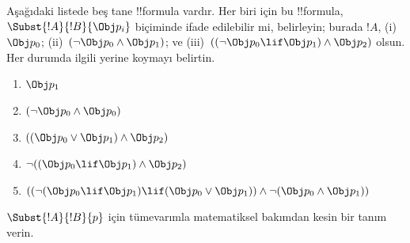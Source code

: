 \documentclass[../../../include/open-logic-section]{subfiles}
\begin{document}
\begin{prob} Aşağıdaki listede beş tane !!{formula} vardır. Her biri için bu
 !!{formula}, \( \Subst{!A}{!B}{\Obj p_i} \) biçiminde ifade edilebilir mi,
 belirleyin; burada \( !A \), (i)~\( \Obj p_0 \); (ii)~\( ( \lnot \Obj p_0
 \land \Obj p_1) \); ve (iii)~\( ( ( \lnot \Obj p_0 \lif \Obj p_1 ) \land
 \Obj p_2 ) \) olsun. Her durumda ilgili yerine koymayı belirtin.
  \begin{enumerate}
    \item \( \Obj p_1 \) 
    \item \( ( \lnot \Obj p_0 \land \Obj p_0 ) \)
    \item \( ( ( \Obj p_0 \lor \Obj p_1 ) \land \Obj p_2 )  \)
    \item \( \lnot ( ( \Obj p_0 \lif \Obj p_1 ) \land \Obj p_2 ) \)
    \item \( (( \lnot ( \Obj p_0 \lif \Obj p_1 ) \lif ( \Obj p_0 \lor \Obj p_1 )) \land \lnot ( \Obj p_0 \land \Obj p_1 )) \)
  \end{enumerate}
\end{prob}

\begin{prob}
$\Subst{!A}{!B}{p}$ için tümevarımla matematiksel bakımdan kesin bir tanım
verin.
\end{prob}
\end{document}
